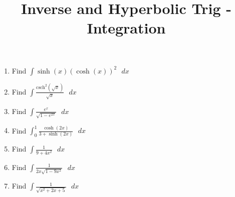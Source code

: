 \documentclass[12pt]{article}
\title{Inverse and Hyperbolic Trig - Integration}
\theoremstyle{remark}
\begin{document}
\maketitle
\begin{enumerate}
\item Find $\displaystyle{ \int \sinh(x) (\cosh(x))^2 \text{ }dx}$
\vspace{4cm} 
\item Find $\displaystyle{ \int \frac{\text{csch} ^2(\sqrt{x})}{\sqrt{x}} \text{ }dx}$
\vspace{4cm} 
\item Find $\displaystyle{ \int \frac{e^x}{\sqrt{1-e^{2x}}} \text{ }dx}$
\vspace{4cm} 
\newpage
\item Find $\displaystyle{ \int_0^1 \frac{\cosh(2x)}{3+\sinh(2x)} \text{ }dx}$
\vspace{4cm}
\item Find $\displaystyle{ \int \frac{1}{9+4x^2} \text{ }dx}$
\vspace{4cm}
\item Find $\displaystyle{ \int \frac{1}{2x\sqrt{1-9x^2}} \text{ }dx}$
\vspace{4cm}
\item Find $\displaystyle{ \int \frac{1}{\sqrt{x^2+2x+5}} \text{ }dx}$
\vspace{4cm}
\end{enumerate}
\end{document}
